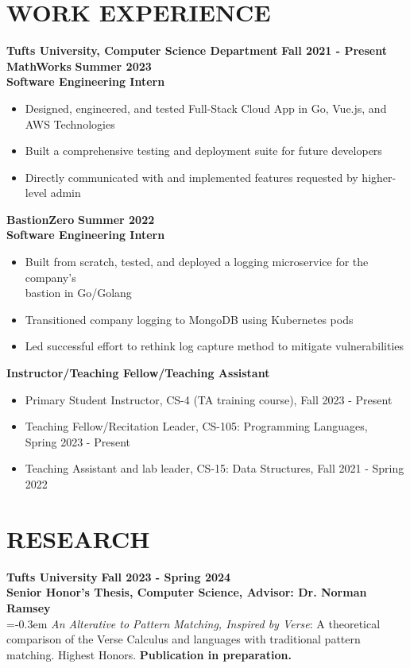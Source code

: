 \documentclass[12pt]{article}
\begin{document}
\section*{WORK EXPERIENCE}
\textbf{Tufts University, Computer Science Department} \hfill \textbf{Fall 2021 - Present}  \\
\textbf{MathWorks} \hfill \textbf{Summer 2023} \\
\textbf{Software Engineering Intern}
\begin{itemize}
    \itemsep=-0.3em
    \item Designed, engineered, and tested Full-Stack Cloud App in Go, Vue.js, and \\ AWS Technologies
    \item Built a comprehensive testing and deployment suite for future developers
    \item Directly communicated with and implemented features requested by higher-level admin
\end{itemize}
\textbf{BastionZero} \hfill \textbf{Summer 2022} \\
\textbf{Software Engineering Intern}
\begin{itemize}
    \itemsep=-0.3em
    \item Built from scratch, tested, and deployed a logging microservice for the company's \\
    bastion in Go/Golang
    \item Transitioned company logging to MongoDB using Kubernetes pods
    \item Led successful effort to rethink log capture method to mitigate vulnerabilities
\end{itemize}
\textbf{Instructor/Teaching Fellow/Teaching Assistant}
\begin{itemize}
    \itemsep=-0.3em
    \item Primary Student Instructor, CS-4 (TA training course), Fall 2023 - Present 
    \item Teaching Fellow/Recitation Leader, CS-105: Programming Languages, \\ Spring 2023 - Present
    \item Teaching Assistant and lab leader, CS-15: Data Structures, Fall 2021 - Spring 2022
\end{itemize}

\section*{RESEARCH}
\textbf{Tufts University} \hfill \textbf{Fall 2023 - Spring 2024} \\
\textbf{Senior Honor's Thesis, Computer Science, Advisor: Dr. Norman Ramsey} \\
    \itemsep=-0.3em \textit{An Alterative to Pattern Matching, Inspired by
    Verse}: A theoretical comparison of the Verse Calculus and languages with
    traditional pattern matching. Highest Honors. \textbf{Publication in
    preparation.} \\
\end{document}

